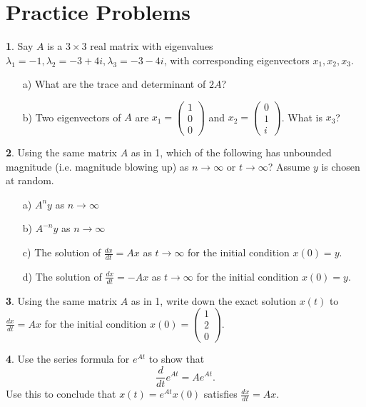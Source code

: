 \documentclass{article}
\theoremstyle{definition}
\newtheorem{prob}{}
\begin{document}
\section*{Practice Problems}
\begin{prob}
	Say $A$ is a $3 \times 3$ real matrix with eigenvalues $\lambda_1=-1, \lambda_2=-3+4i, \lambda_3=-3-4i$, with corresponding eigenvectors $x_1, x_2, x_3$. 
	\begin{itemize}
		\item[a)] What are the trace and determinant of $2A$?
		\item[b)] Two eigenvectors of $A$ are $x_1=\begin{pmatrix}
			1\\0\\0
		\end{pmatrix}$
	and 
	$x_2=\begin{pmatrix}
		0\\1\\i
	\end{pmatrix}$.
What is $x_3$?
	\end{itemize}
\end{prob}


\begin{prob}
	Using the same matrix $A$ as in 1, which of the following has unbounded magnitude (i.e. magnitude blowing up) as $n \to \infty$ or $t \to \infty$? Assume $y$ is chosen at random.
	\begin{itemize}
		\item[a)] $A^n y$ as $n \to \infty$
		\item[b)] $A^{-n}y$ as $n \to \infty$
		\item[c)] The solution of $\frac{dx}{dt}=Ax$ as $t \to \infty$ for the initial condition $x(0)=y$.
		\item[d)] The solution of $\frac{dx}{dt}=-Ax$ as $t \to \infty$ for the initial condition $x(0)=y$.
	\end{itemize}
\end{prob}



\begin{prob}
	Using the same matrix $A$ as in 1, write down the exact solution $x(t)$ to $\frac{dx}{dt}= Ax$ for the initial condition $x(0)= \begin{pmatrix}
		1\\2\\0
	\end{pmatrix}$.
\end{prob}


\begin{prob}
	Use the series formula for $e^{At}$ to show that
	\[\frac{d}{dt}e^{At}= A e^{At}.\]
	Use this to conclude that $x(t)= e^{At}x(0)$ satisfies $\frac{dx}{dt}= Ax$.
\end{prob}
\end{document}
